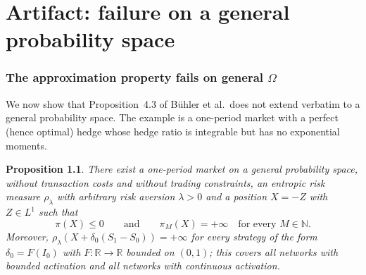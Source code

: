 \documentclass[11pt,a4paper]{report}
\numberwithin{equation}{chapter}
\theoremstyle{plain}
\newtheorem{proposition}{Proposition}[chapter]
\theoremstyle{definition}
\newcommand{\R}{\mathbb{R}}
\newcommand{\N}{\mathbb{N}}
\begin{document}
\setcounter{chapter}{3}

\chapter{Artifact: failure on a general probability space}

\subsection*{The approximation property fails on general $\Omega$}

We now show that Proposition~4.3 of B\"uhler et al.\ does not extend
verbatim to a general probability space. The example is a one-period market with a perfect
(hence optimal) hedge whose hedge ratio is integrable but has no
exponential moments.

\begin{proposition}\label{prop:counterexample}
  There exist a one-period market on a general probability space,
  without transaction costs and without trading constraints, an entropic
  risk measure $\rho_\lambda$ with arbitrary risk aversion $\lambda>0$
  and a position $X=-Z$ with $Z\in L^1$ such that
  \[
    \pi(X)\le0\qquad\text{and}\qquad\pi_M(X)=+\infty\quad\text{for every }M\in\N.
  \]
  Moreover, $\rho_\lambda(X+\delta_0(S_1-S_0))=+\infty$ for \emph{every}
  strategy of the form $\delta_0=F(I_0)$ with $F:\R\to\R$ bounded on
  $(0,1)$; this covers all networks with bounded activation and all
  networks with continuous activation.
\end{proposition}
\end{document}
